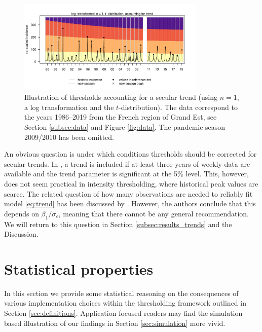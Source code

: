 \documentclass[12pt]{article}
\begin{document}
\begin{figure}[h!]
\begin{center}
\includegraphics[width = 0.8\textwidth]{figure/illustration_trend.pdf}\vspace{-5mm}
\end{center}
\caption{Illustration of thresholds accounting for a secular trend (using $n = 1$, a log transformation and the $t$-distribution). The data correspond to the years 1986--2019 from the French region of Grand Est, see Section \ref{subsec:data} and Figure \ref{fig:data}. The pandemic season 2009/2010 has been omitted.}
\label{fig:illustration_trend}
\end{figure}



An obvious question is under which conditions thresholds should be corrected for secular trends. In \cite{Farrington1996}, a trend is included if at least three years of weekly data are available and the trend parameter is significant at the 5\% level. This, however, does not seem practical in intensity thresholding, where historical peak values are scarce. The related question of how many observations are needed to reliably fit model \eqref{eq:trend} has been discussed by \cite{Hyndman2007}. However, the authors conclude that this depends on $\beta_1/\sigma_\varepsilon$, meaning that there cannot be any general recommendation. We will return to this question in Section \ref{subsec:results_trends} and the Discussion.

 
\section{Statistical properties}
\label{sec:analytical_results}

In this section we provide some statistical reasoning on the consequences of various implementation choices within the thresholding framework outlined in Section \ref{sec:definitions}. Application-focused readers may find the simulation-based illustration of our findings in Section \ref{sec:simulation} more vivid.
\end{document}
